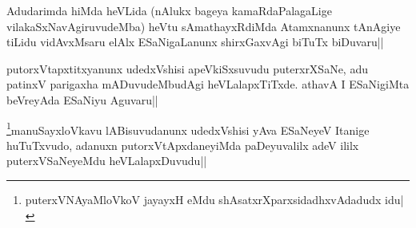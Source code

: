 \begin{artha}
Adudarimda hiMda heVLida (nAlukx bageya kamaRdaPalagaLige vilakaSxNavAgiruvudeMba) heVtu sAmathayxRdiMda Atamxnanunx tAnAgiye tiLidu vidAvxMsaru elAlx ESaNigaLanunx shirxGaxvAgi biTuTx biDuvaru||
\end{artha}


\begin{artha}
putorxVtapxtitxyanunx udedxVshisi apeVkiSxsuvudu puterxrXSaNe, adu patinxV parigaxha mADuvudeMbudAgi heVLalapxTiTxde. athavA I ESaNigiMta beVreyAda ESaNiyu Aguvaru|| 
\end{artha}


\begin{artha}
\footnote{puterxVNAyaMloVkoV jayayxH eMdu shAsatxrXparxsidadhxvAdadudx idu|}manuSayxloVkavu lABisuvudanunx udedxVshisi yAva ESaNeyeV Itanige huTuTxvudo, adanuxn putorxVtApxdaneyiMda paDeyuvalilx adeV ililx puterxVSaNeyeMdu heVLalapxDuvudu||
\end{artha}
